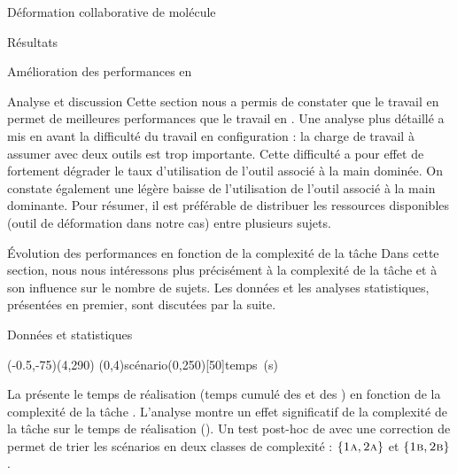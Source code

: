 \documentclass[myfrancais,ngerman,english,french]{mythesis}
\begin{document}
\begin{mychapter}{Déformation collaborative de molécule}
\begin{mysection}{Résultats}
\begin{mysubsection}{Amélioration des performances en }
\begin{mysubsubsection}{Analyse et discussion}
					Cette section nous a permis de constater que le travail en  permet de meilleures performances que le travail en .
					Une analyse plus détaillé a mis en avant la difficulté du travail en configuration  : la charge de travail à assumer avec deux outils est trop importante.
					Cette difficulté a pour effet de fortement dégrader le taux d'utilisation de l'outil associé à la main dominée.
					On constate également une légère baisse de l'utilisation de l'outil associé à la main dominante.
					Pour résumer, il est préférable de distribuer les ressources disponibles (outil de déformation dans notre cas) entre plusieurs sujets.
				\end{mysubsubsection}
			\end{mysubsection}
			\begin{mysubsection}{Évolution des performances en fonction de la complexité de la tâche}
				Dans cette section, nous nous intéressons plus précisément à la complexité de la tâche et à son influence sur le nombre de sujets.
				Les données et les analyses statistiques, présentées en premier, sont discutées par la suite.
				\begin{mysubsubsection}{Données et statistiques}
					\begin{myfigure}
						\begin{myps}(-0.5,-75)(4,290)
							\myaxes(0,4){scénario}(0,250)[50]{temps~(s)}
						\end{myps}
					\end{myfigure}

					La  présente le temps de réalisation  (temps cumulé des  et des ) en fonction de la complexité de la tâche .
					L'analyse montre un effet significatif de la complexité de la tâche  sur le temps de réalisation  ().
					Un test post-hoc de  avec une correction de  permet de trier les scénarios en deux classes de complexité : $\left\{\textsc{1a}, \textsc{2a}\right\}$ et $\left\{\textsc{1b}, \textsc{2b}\right\}$.


\end{mysubsubsection}
\end{mysubsection}
\end{mysection}
\end{mychapter}
\end{document}
